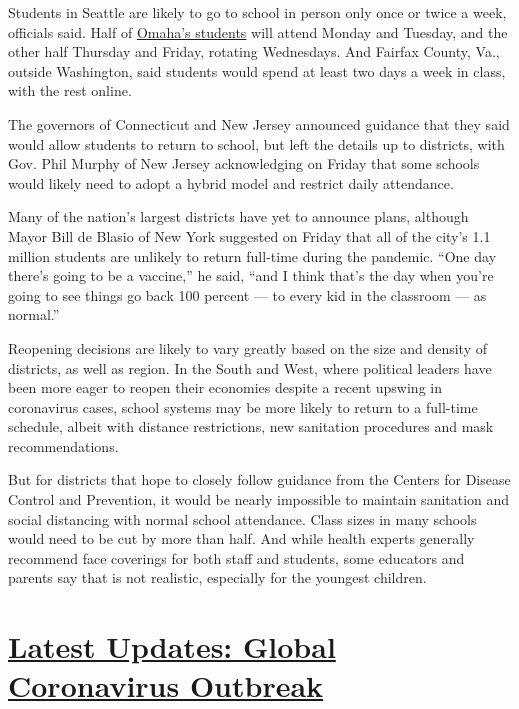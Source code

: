 Students in Seattle are likely to go to school in person only once or
twice a week, officials said. Half of
\href{https://www.omaha.com/news/ops-outlines-plan-for-fall-school-reopening-with-only-half-of-students-in-buldings-at/article_ca1b2f72-9cdd-5cfe-a77a-2a5d0821dfa6.html}{Omaha's
students} will attend Monday and Tuesday, and the other half Thursday
and Friday, rotating Wednesdays. And Fairfax County, Va., outside
Washington, said students would spend at least two days a week in class,
with the rest online.

The governors of Connecticut and New Jersey announced guidance that they
said would allow students to return to school, but left the details up
to districts, with Gov. Phil Murphy of New Jersey acknowledging on
Friday that some schools would likely need to adopt a hybrid model and
restrict daily attendance.

Many of the nation's largest districts have yet to announce plans,
although Mayor Bill de Blasio of New York suggested on Friday that all
of the city's 1.1 million students are unlikely to return full-time
during the pandemic. ``One day there's going to be a vaccine,'' he said,
``and I think that's the day when you're going to see things go back 100
percent --- to every kid in the classroom --- as normal.''

Reopening decisions are likely to vary greatly based on the size and
density of districts, as well as region. In the South and West, where
political leaders have been more eager to reopen their economies despite
a recent upswing in coronavirus cases, school systems may be more likely
to return to a full-time schedule, albeit with distance restrictions,
new sanitation procedures and mask recommendations.

But for districts that hope to closely follow guidance from the Centers
for Disease Control and Prevention, it would be nearly impossible to
maintain sanitation and social distancing with normal school attendance.
Class sizes in many schools would need to be cut by more than half. And
while health experts generally recommend face coverings for both staff
and students, some educators and parents say that is not realistic,
especially for the youngest children.

\hypertarget{latest-updates-global-coronavirus-outbreak}{%
\section{\texorpdfstring{\href{https://www.nytimes3xbfgragh.onion/2020/08/04/world/coronavirus-cases.html?action=click\&pgtype=Article\&state=default\&region=MAIN_CONTENT_1\&context=storylines_live_updates}{Latest
Updates: Global Coronavirus
Outbreak}}{Latest Updates: Global Coronavirus Outbreak}}\label{latest-updates-global-coronavirus-outbreak}}


